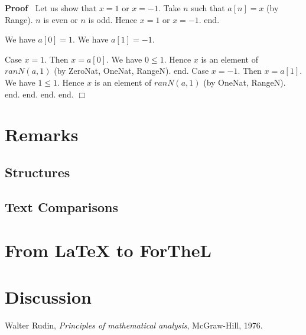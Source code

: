 \documentclass{article}
\newenvironment{forthel}{\begin{leftbar}}{\end{leftbar}}
\newenvironment{proof}{\noindent\textbf{Proof\ }}{\hspace*{\fill}$\Box$\medskip}
\begin{document}
\begin{forthel}
\begin{proof}
	Let us show that $x = 1$ or $x = -1$.
	Take $n$ such that $a[n] = x$ (by Range).
	$n$ is even or $n$ is odd.
	Hence $x = 1$ or $x = -1$.
	end.
	
	We have $a[0] = 1$.
	We have $a[1] = -1$.
	
	Case $x = 1$.
	Then $x = a[0]$.
	We have $0 \leq 1$.
	Hence $x$ is an element of $ranN(a,1)$ (by ZeroNat, OneNat, RangeN).
	end.
	Case $x = -1$.
	Then $x = a[1]$.
	We have $1 \leq 1$.
	Hence $x$ is an element of $ranN(a,1)$ (by OneNat, RangeN).
	end.
	end.
	end.
	end.
	\end{proof}
	
\end{forthel}

\section{Remarks}
\subsection{Structures}


\subsection{Text Comparisons}



\section{{From \LaTeX} to ForTheL}



\section{Discussion}


\begin{thebibliography}{1}

  Walter Rudin,
  \textit{Principles of mathematical analysis},
  McGraw-Hill,
  1976.

\end{thebibliography}
  
\end{document}
